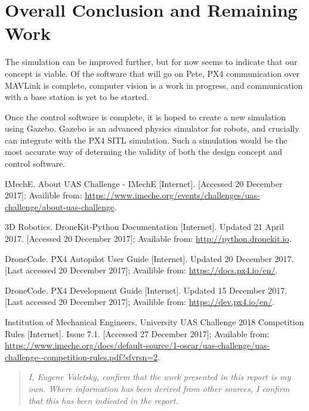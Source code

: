 \documentclass[10pt]{article}
\begin{document}
\section{Overall Conclusion and Remaining Work}
The simulation can be improved further, but for now seems to indicate that our concept is viable. Of the software that will go on Pete, PX4 communication over MAVLink is complete, computer vision is a work in progress, and communication with a base station is yet to be started.

Once the control software is complete, it is hoped to create a new simulation using Gazebo. Gazebo is an advanced physics simulator for robots, and crucially can integrate with the PX4 SITL simulation. Such a simulation would be the most accurate way of determing the validity of both the design concept and control software.


\begin{thebibliography}{11}

        IMechE. About UAS Challenge - IMechE [Internet]. [Accessed 20 December 2017]; Availible from: \url{https://www.imeche.org/events/challenges/uas-challenge/about-uas-challenge}.

        3D Robotics. DroneKit-Python Documentation [Internet]. Updated 21 April 2017. [Accessed 20 December 2017]; Available from: \url{http://python.dronekit.io}.

        DroneCode. PX4 Autopilot User Guide [Internet]. Updated 20 December 2017. [Last accessed 20 December 2017]; Availible from: \url{https://docs.px4.io/en/}.

        DroneCode. PX4 Development Guide [Internet]. Updated 15 December 2017. [Last accessed 20 December 2017]; Availible from: \url{https://dev.px4.io/en/}.

        Institution of Mechanical Engineers. University UAS Challenge 2018 Competition Rules [Internet]. Issue 7.1. [Accessed 27 December 2017]; Available from: \url{https://www.imeche.org/docs/default-source/1-oscar/uas-challenge/uas-challenge--competition-rules.pdf?sfvrsn=2}.

\end{thebibliography}

\begin{quote}
    \emph{I, Eugene Valetsky, confirm that the work presented in this report is my own. Where information has been derived from other sources, I confirm that this has been indicated in the report.}
\end{quote}
\end{document}
